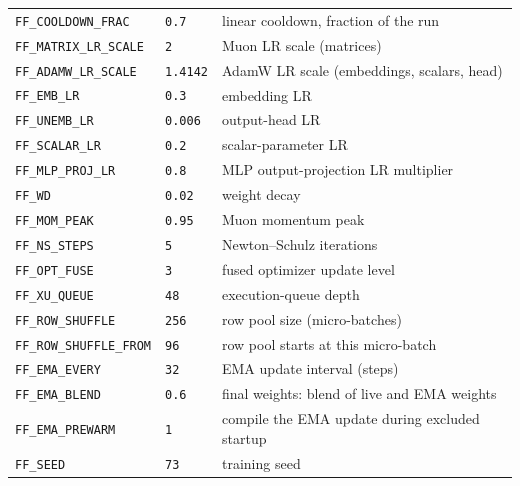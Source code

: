 {\begin{tabular}{@{}lp{3.2cm}p{7.6cm}@{}}
\texttt{FF\_COOLDOWN\_FRAC} & \texttt{0.7} & linear cooldown, fraction of the run \\
\texttt{FF\_MATRIX\_LR\_SCALE} & \texttt{2} & Muon LR scale (matrices) \\
\texttt{FF\_ADAMW\_LR\_SCALE} & \texttt{1.4142} & AdamW LR scale (embeddings, scalars, head) \\
\texttt{FF\_EMB\_LR} & \texttt{0.3} & embedding LR \\
\texttt{FF\_UNEMB\_LR} & \texttt{0.006} & output-head LR \\
\texttt{FF\_SCALAR\_LR} & \texttt{0.2} & scalar-parameter LR \\
\texttt{FF\_MLP\_PROJ\_LR} & \texttt{0.8} & MLP output-projection LR multiplier \\
\texttt{FF\_WD} & \texttt{0.02} & weight decay \\
\texttt{FF\_MOM\_PEAK} & \texttt{0.95} & Muon momentum peak \\
\texttt{FF\_NS\_STEPS} & \texttt{5} & Newton--Schulz iterations \\
\texttt{FF\_OPT\_FUSE} & \texttt{3} & fused optimizer update level \\
\texttt{FF\_XU\_QUEUE} & \texttt{48} & execution-queue depth \\
\texttt{FF\_ROW\_SHUFFLE} & \texttt{256} & row pool size (micro-batches) \\
\texttt{FF\_ROW\_SHUFFLE\_FROM} & \texttt{96} & row pool starts at this micro-batch \\
\texttt{FF\_EMA\_EVERY} & \texttt{32} & EMA update interval (steps) \\
\texttt{FF\_EMA\_BLEND} & \texttt{0.6} & final weights: blend of live and EMA weights \\
\texttt{FF\_EMA\_PREWARM} & \texttt{1} & compile the EMA update during excluded startup \\
\texttt{FF\_SEED} & \texttt{73} & training seed \\
\bottomrule
\end{tabular}
}
